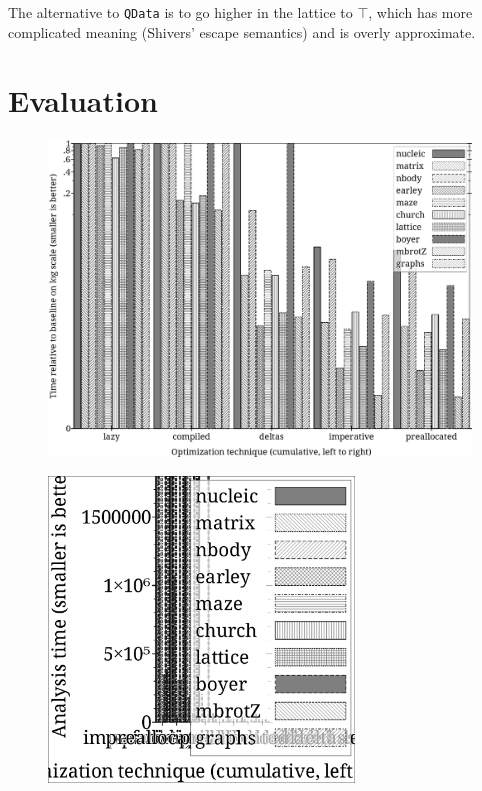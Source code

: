 \documentclass[preprint,onecolumn,9pt]{sigplanconf} %
\begin{document}
The alternative to {\tt QData} is to go higher in the lattice to
$\top$, which has more complicated meaning (Shivers' escape semantics) and
is overly approximate.

\section{Evaluation}
\label{sec:eval}

\begin{figure}
\begin{center}
\includegraphics[width=6in]{rel-time.ps}
\end{center}
\end{figure}

\begin{figure}
\begin{center}
\includegraphics[width=3.2in]{abs-time.ps}
\end{center}
\end{figure}
\end{document}
